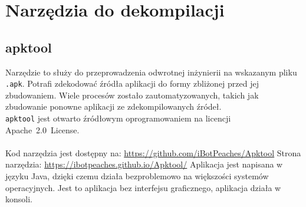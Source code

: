 \documentclass[12pt,a4paper,leqno,oneside,titlepage]{book}
\begin{document}
\chapter{Narzędzia do dekompilacji}
%
\section{apktool}
%
Narzędzie to służy do przeprowadzenia odwrotnej inżynierii na wskazanym pliku \verb|.apk|. Potrafi zdekodować źródła aplikacji do formy zbliżonej przed jej zbudowaniem. Wiele procesów zostało zautomatyzowanych, takich jak zbudowanie ponowne aplikacji ze zdekompilowanych źródeł. \\
\lstinline|apktool| jest otwarto źródłowym oprogramowaniem na licencji \mbox{Apache 2.0 License.} \\
\\
Kod narzędzia jest dostępny na: \url{https://github.com/iBotPeaches/Apktool} \newline
Strona narzędzia: \url{https://ibotpeaches.github.io/Apktool/}
\newline
\newline
Aplikacja jest napisana w języku Java, dzięki czemu działa bezproblemowo na większości systemów operacyjnych. Jest to aplikacja bez interfejsu graficznego, aplikacja działa w konsoli.
\end{document}
